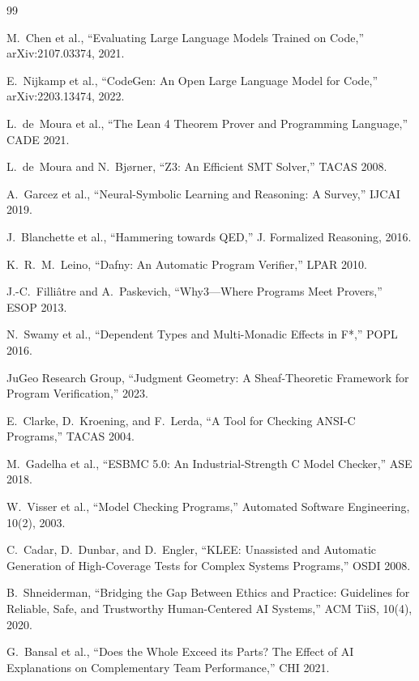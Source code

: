 \documentclass[11pt]{article}
\begin{document}
\begin{thebibliography}{99}

M.~Chen et al., ``Evaluating Large Language Models Trained on Code,'' 
arXiv:2107.03374, 2021.

E.~Nijkamp et al., ``CodeGen: An Open Large Language Model for Code,'' 
arXiv:2203.13474, 2022.

L.~de~Moura et al., ``The Lean 4 Theorem Prover and Programming Language,'' 
CADE 2021.

L.~de~Moura and N.~Bjørner, ``Z3: An Efficient SMT Solver,'' TACAS 2008.

A.~Garcez et al., ``Neural-Symbolic Learning and Reasoning: A Survey,'' 
IJCAI 2019.

J.~Blanchette et al., ``Hammering towards QED,'' J. Formalized Reasoning, 2016.

K.~R.~M.~Leino, ``Dafny: An Automatic Program Verifier,'' LPAR 2010.

J.-C.~Filliâtre and A.~Paskevich, ``Why3---Where Programs Meet Provers,'' 
ESOP 2013.

N.~Swamy et al., ``Dependent Types and Multi-Monadic Effects in F*,'' 
POPL 2016.

JuGeo Research Group, ``Judgment Geometry: A Sheaf-Theoretic Framework for 
Program Verification,'' 2023.

E.~Clarke, D.~Kroening, and F.~Lerda, ``A Tool for Checking ANSI-C
Programs,'' TACAS 2004.

M.~Gadelha et al., ``ESBMC 5.0: An Industrial-Strength C Model
Checker,'' ASE 2018.

W.~Visser et al., ``Model Checking Programs,'' Automated Software
Engineering, 10(2), 2003.

C.~Cadar, D.~Dunbar, and D.~Engler, ``KLEE: Unassisted and Automatic
Generation of High-Coverage Tests for Complex Systems Programs,''
OSDI 2008.

B.~Shneiderman, ``Bridging the Gap Between Ethics and Practice:
Guidelines for Reliable, Safe, and Trustworthy Human-Centered AI
Systems,'' ACM TiiS, 10(4), 2020.

G.~Bansal et al., ``Does the Whole Exceed its Parts? The Effect of AI
Explanations on Complementary Team Performance,'' CHI 2021.


\end{thebibliography}
\end{document}
